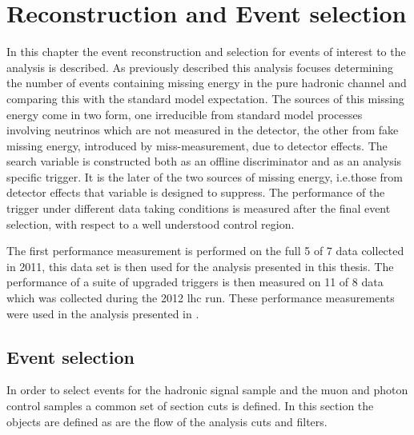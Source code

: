 




\chapter{Reconstruction and Event selection} %
\label{cha:the_t_analysis}
In this chapter the event reconstruction and selection for events of interest to the analysis is described. As previously described this analysis focuses determining the number of events containing missing energy in the pure hadronic channel and comparing this with the standard model expectation. The sources of this missing energy come in two form, one irreducible from standard model processes involving neutrinos which are not measured in the detector, the other from fake missing energy, introduced by miss-measurement, due to detector effects.  The search variable \alt is constructed both as an offline discriminator and as an analysis specific trigger. It is the later of the two sources of missing energy, i.e.those from detector effects that \alt variable is designed to suppress. The performance of the trigger under different data taking conditions is measured after the final event selection, with respect to a well understood control region.

The first performance measurement is performed on the full \unit{5}{\invfb} of 
\unit{7}{\TeV} data collected in 2011, this data set is then used for the  
analysis presented in this thesis. The performance of a suite of upgraded \alt 
triggers is then measured on \unit{11}{\invfb} of \unit{8}{\TeV} data which was 
collected during the 2012 \ac{lhc} run. These performance measurements were 
used in the analysis presented in .




\section{Event selection} %
\label{sec:event_selection}
In order to select events for the hadronic signal sample and the muon and 
photon control samples a common set of section cuts is defined. In this section 
the objects are defined as are the flow of the analysis cuts and filters.

